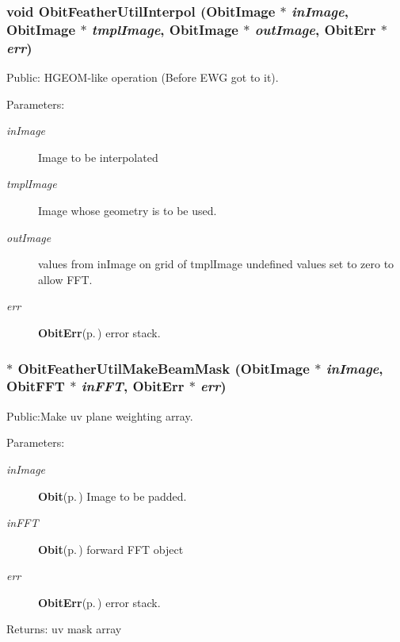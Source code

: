 \subsubsection{\setlength{\rightskip}{0pt plus 5cm}void Obit\-Feather\-Util\-Interpol ({\bf Obit\-Image} $\ast$ {\em in\-Image}, {\bf Obit\-Image} $\ast$ {\em tmpl\-Image}, {\bf Obit\-Image} $\ast$ {\em out\-Image}, {\bf Obit\-Err} $\ast$ {\em err})}\label{ObitFeatherUtil_8h_a10}


Public: HGEOM-like operation (Before EWG got to it). 

\begin{Desc}
\item[Parameters:]
\begin{description}
\item[{\em in\-Image}]Image to be interpolated \item[{\em tmpl\-Image}]Image whose geometry is to be used. \item[{\em out\-Image}]values from in\-Image on grid of tmpl\-Image undefined values set to zero to allow FFT. \item[{\em err}]{\bf Obit\-Err}{\rm (p.\,\pageref{structObitErr})} error stack. \end{description}
\end{Desc}
\subsubsection{$\ast$ Obit\-Feather\-Util\-Make\-Beam\-Mask ({\bf Obit\-Image} $\ast$ {\em in\-Image}, {\bf Obit\-FFT} $\ast$ {\em in\-FFT}, {\bf Obit\-Err} $\ast$ {\em err})}\label{ObitFeatherUtil_8h_a7}


Public:Make uv plane weighting array. 

\begin{Desc}
\item[Parameters:]
\begin{description}
\item[{\em in\-Image}]{\bf Obit}{\rm (p.\,\pageref{structObit})} Image to be padded. \item[{\em in\-FFT}]{\bf Obit}{\rm (p.\,\pageref{structObit})} forward FFT object \item[{\em err}]{\bf Obit\-Err}{\rm (p.\,\pageref{structObitErr})} error stack. \end{description}
\end{Desc}
\begin{Desc}
\item[Returns:]uv mask array \end{Desc}

